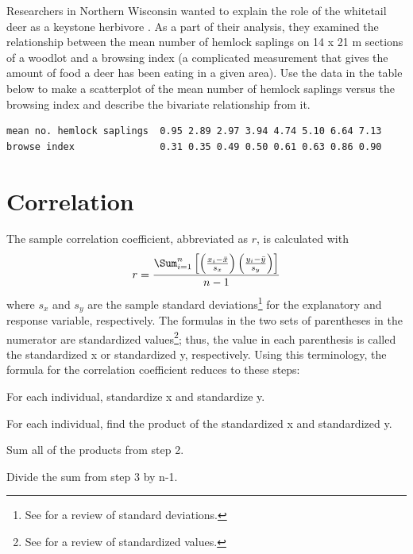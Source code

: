 \documentclass[10pt,openany]{book}\usepackage[]{graphicx}\usepackage[]{color}
\begin{document}
\begin{exsection}
  \item \label{revex:qbEDAScat} \rhw{}Researchers in Northern Wisconsin wanted to explain the role of the whitetail deer as a keystone herbivore \citep{WallerAlverson1997}.  As a part of their analysis, they examined the relationship between the mean number of hemlock saplings on 14 x 21 m sections of a woodlot and a browsing index (a complicated measurement that gives the amount of food a deer has been eating in a given area).  Use the data in the table below to make a scatterplot of the mean number of hemlock saplings versus the browsing index and describe the bivariate relationship from it. 
  \begin{Verbatim}
mean no. hemlock saplings  0.95 2.89 2.97 3.94 4.74 5.10 6.64 7.13
browse index               0.31 0.35 0.49 0.50 0.61 0.63 0.86 0.90
  \end{Verbatim}
\end{exsection}


\vspace{-18pt}
\section{Correlation}\label{sect:corr}
The sample correlation coefficient, abbreviated as $r$, is calculated with
\begin{equation}
  r = \frac{\Sum_{i=1}^{n}\left[\left(\frac{x_{i}-\bar{x}}{s_{x}}\right)\left(\frac{y_{i}-\bar{y}}{s_{y}}\right)\right]}{n-1}
\end{equation}
where $s_{x}$ and $s_{y}$ are the sample standard deviations\footnote{See  for a review of standard deviations.} for the explanatory and response variable, respectively.  The formulas in the two sets of parentheses in the numerator are standardized values\footnote{See  for a review of standardized values.}; thus, the value in each parenthesis is called the standardized x or standardized y, respectively.  Using this terminology, the formula for the correlation coefficient reduces to these steps:
\begin{Enumerate}
  \item For each individual, standardize x and standardize y.
  \item For each individual, find the product of the standardized x and standardized y.
  \item Sum all of the products from step 2.
  \item Divide the sum from step 3 by n-1.
\end{Enumerate}
\end{document}
